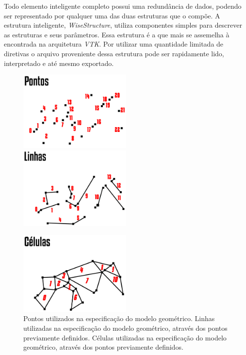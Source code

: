 Todo elemento inteligente completo possui uma redundância de dados, podendo ser representado por qualquer uma das duas estruturas que o compõe. A estrutura inteligente, \textit{WiseStructure}, utiliza componentes simples para descrever as estruturas e seus parâmetros. Essa estrutura é a que mais se assemelha à encontrada na arquitetura \textit{VTK}. Por utilizar uma quantidade limitada de diretivas o arquivo proveniente dessa estrutura pode ser rapidamente lido, interpretado e até mesmo exportado.

\begin{figure}[!htbp]
	\includegraphics[width=0.5\textwidth]{Figures/WiseElementPoints@16x.png}
	\includegraphics[width=0.5\textwidth]{Figures/WiseElementLines@16x.png}
	
	\includegraphics[width=0.5\textwidth]{Figures/WiseElementCells@16x.png}
	\caption{Pontos utilizados na especificação do modelo geométrico. Linhas utilizadas na especificação do modelo geométrico, através dos pontos previamente definidos. Células utilizadas na especificação do modelo geométrico, através dos pontos previamente definidos.}
	\label{fig2:wiselementstructs}
\end{figure}


